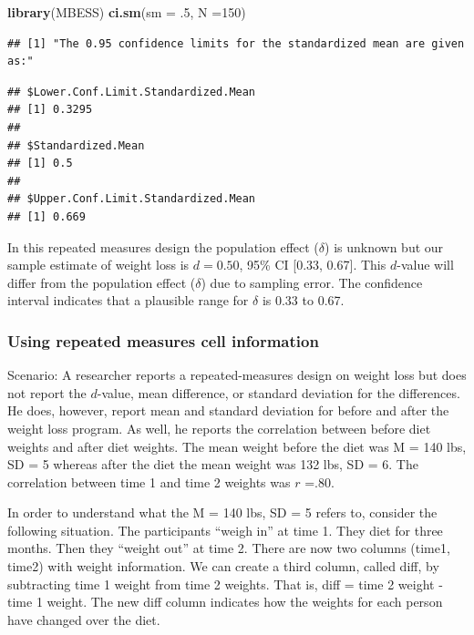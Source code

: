 \documentclass[
]{krantz}
\makeatletter
\newenvironment{Shaded}{\begin{snugshade}}{\end{snugshade}}
\newcommand{\DataTypeTok}[1]{\textcolor[rgb]{0.27,0.27,0.27}{#1}}
\newcommand{\DecValTok}[1]{\textcolor[rgb]{0.06,0.06,0.06}{#1}}
\newcommand{\FloatTok}[1]{\textcolor[rgb]{0.06,0.06,0.06}{#1}}
\newcommand{\KeywordTok}[1]{\textcolor[rgb]{0.27,0.27,0.27}{\textbf{#1}}}
\newcommand{\NormalTok}[1]{#1}
\newenvironment{kframe}{%
\medskip{}
\setlength{\fboxsep}{.8em}
 \def\at@end@of@kframe{}%
 \ifinner\ifhmode%
  \def\at@end@of@kframe{\end{minipage}}%
  \begin{minipage}{\columnwidth}%
 \fi\fi%
 \def\FrameCommand##1{\hskip\@totalleftmargin \hskip-\fboxsep
 \colorbox{shadecolor}{##1}\hskip-\fboxsep
     \hskip-\linewidth \hskip-\@totalleftmargin \hskip\columnwidth}%
 \MakeFramed {\advance\hsize-\width
   \@totalleftmargin\z@ \linewidth\hsize
   \@setminipage}}%
 {\par\unskip\endMakeFramed%
 \at@end@of@kframe}
\renewenvironment{Shaded}{\begin{kframe}}{\end{kframe}}
\makeatother
\begin{document}
\begin{Shaded}
\begin{Highlighting}[]
\KeywordTok{library}\NormalTok{(MBESS)}
\KeywordTok{ci.sm}\NormalTok{(}\DataTypeTok{sm =} \FloatTok{.5}\NormalTok{, }\DataTypeTok{N =}\DecValTok{150}\NormalTok{) }
\end{Highlighting}
\end{Shaded}

\begin{verbatim}
## [1] "The 0.95 confidence limits for the standardized mean are given as:"
\end{verbatim}

\begin{verbatim}
## $Lower.Conf.Limit.Standardized.Mean
## [1] 0.3295
## 
## $Standardized.Mean
## [1] 0.5
## 
## $Upper.Conf.Limit.Standardized.Mean
## [1] 0.669
\end{verbatim}

In this repeated measures design the population effect (\(\delta\)) is unknown but our sample estimate of weight loss is \(d = 0.50\), 95\% CI {[}0.33, 0.67{]}. This \(d\)-value will differ from the population effect (\(\delta\)) due to sampling error. The confidence interval indicates that a plausible range for \(\delta\) is 0.33 to 0.67.

\hypertarget{using-repeated-measures-cell-information}{%
\subsubsection{Using repeated measures cell information}\label{using-repeated-measures-cell-information}}

Scenario: A researcher reports a repeated-measures design on weight loss but does not report the \(d\)-value, mean difference, or standard deviation for the differences. He does, however, report mean and standard deviation for before and after the weight loss program. As well, he reports the correlation between before diet weights and after diet weights. The mean weight before the diet was M = 140 lbs, SD = 5 whereas after the diet the mean weight was 132 lbs, SD = 6. The correlation between time 1 and time 2 weights was \(r\) =.80.

In order to understand what the M = 140 lbs, SD = 5 refers to, consider the following situation. The participants ``weigh in'' at time 1. They diet for three months. Then they ``weight out'' at time 2. There are now two columns (time1, time2) with weight information. We can create a third column, called diff, by subtracting time 1 weight from time 2 weights. That is, diff = time 2 weight - time 1 weight. The new diff column indicates how the weights for each person have changed over the diet.
\end{document}
